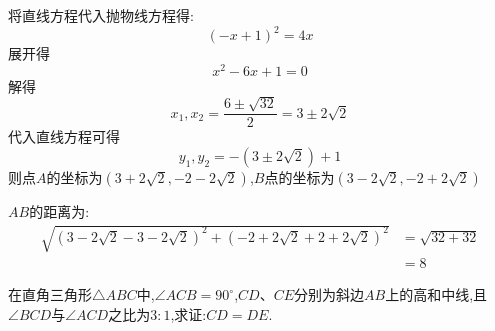 \begin{questions}
\begin{solution}
\begin{cenum}
\begin{equation}
			      \end{equation}
			\item 将直线方程代入抛物线方程得:
			      \begin{equation*}
				      (-x + 1)^2 = 4x
			      \end{equation*}
			      展开得
			      \begin{equation*}
				      x^2 -6x + 1  = 0
			      \end{equation*}
			      解得
			      \begin{equation*}
				      x_1,x_2 = \frac{6 \pm \sqrt{32}}{2} = 3 \pm 2\sqrt{2}
			      \end{equation*}
			      代入直线方程可得
			      \begin{equation*}
				      y_1,y_2 = -(3\pm2\sqrt{2}) + 1
			      \end{equation*}
			      则点$A$的坐标为$(3+2\sqrt{2}, -2 - 2\sqrt{2})$,$B$点的坐标为$(3-2\sqrt{2}, -2 + 2\sqrt{2})$
			\item $AB$的距离为:
			      \begin{align*}
				      \sqrt{(3-2\sqrt{2} - 3 - 2\sqrt{2})^2 + (-2 + 2\sqrt{2} + 2 + 2\sqrt{2})^2}
				       & = \sqrt{32 + 32} \\
				       & = 8
			      \end{align*}
		\end{cenum}
	\end{solution}
	\question[8] 在直角三角形$ \triangle{ABC} $中,$ \angle{ACB} = 90^\circ
	$,$CD$、$CE$分别为斜边$AB$上的高和中线,且$\angle{BCD}$与$\angle{ACD}$之比为$3:1$,求证:$CD=DE$.

	\begin{center}
	\end{center}


\end{questions}
